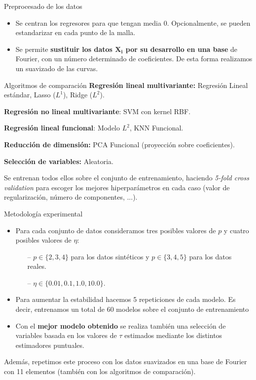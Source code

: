 \documentclass[10pt, spanish, professionalfonts]{beamer}
\begin{document}
\begin{frame}{Preprocesado de los datos}
  \begin{itemize}
    \item Se centran los regresores para que tengan media \(0\). Opcionalmente, se pueden estandarizar en cada punto de la malla.
    \item Se permite \textbf{sustituir los datos \(\boldsymbol{X_i}\) por su desarrollo en una base} de Fourier, con un número determinado de coeficientes. De esta forma realizamos un suavizado de las curvas.
  \end{itemize}
\end{frame}

\begin{frame}{Algoritmos de comparación}
  \textbf{Regresión lineal multivariante:} Regresión Lineal estándar, Lasso (\(L^1\)), Ridge (\(L^2\)).

  \textbf{Regresión no lineal multivariante}: SVM con kernel RBF.

  \textbf{Regresión lineal funcional}: Modelo \(L^2\), KNN Funcional.

  \textbf{Reducción de dimensión:} PCA Funcional (proyección sobre coeficientes).

  \textbf{Selección de variables:} Aleatoria.

  \vspace{1em}

  Se entrenan todos ellos sobre el conjunto de entrenamiento, haciendo \textit{5-fold cross validation} para escoger los mejores hiperparámetros en cada caso (valor de regularización, número de componentes, ...).
\end{frame}

\begin{frame}{Metodología experimental}
  \begin{itemize}
  \item Para cada conjunto de datos consideramos tres posibles valores de \(p\) y cuatro posibles valores de \(\eta\):
  \begin{itemize}
    \item[--] \(p\in \{2,3,4\}\) para los datos sintéticos y \(p\in \{3, 4, 5\}\) para los datos reales.
      \item[--] \(\eta \in \{0.01, 0.1, 1.0, 10.0\}\).
  \end{itemize}

  \item Para aumentar la estabilidad hacemos 5 repeticiones de cada modelo. Es decir, entrenamos un total de 60 modelos sobre el conjunto de entrenamiento

  \item Con el \textbf{mejor modelo obtenido} se realiza también una selección de variables basada en los valores de \(\tau\) estimados mediante los distintos estimadores puntuales.
\end{itemize}

Además, repetimos este proceso con los datos suavizados en una base de Fourier con 11 elementos (también con los algoritmos de comparación).
\end{frame}
\end{document}
